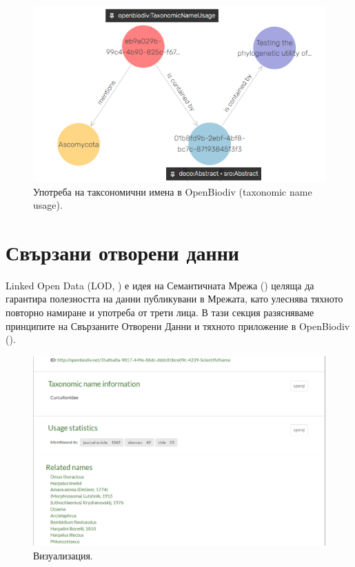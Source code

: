 \begin{figure}
\centering
\includegraphics[width=\textwidth]{Figures/tnu-vis}
\decoRule
\caption[Visual graph of a taxonomic name usage]{Употреба на таксономични имена в OpenBiodiv (taxonomic name usage).}
\label{fig:tnu-vis}
\end{figure}

\section{Свързани отворени данни}

Linked Open Data (LOD, \cite{heath_linked_2011}) е идея на Семантичната Мрежа (\cite{berners-lee_semantic_2001}) целяща да гарантира полезността на данни публикувани в Мрежата, като улеснява тяхното повторно намиране и употреба от трети лица. В тази секция разясняваме принципите на Свързаните Отворени Данни и тяхното приложение в OpenBiodiv (\cite{heath_linked_2011}).

\begin{figure}
\centering
\includegraphics[width=\textwidth]{Figures/portal-name-visualization}
\decoRule
\caption{Визуализация.}
\label{fig:portal-name-visualization}
\end{figure}


